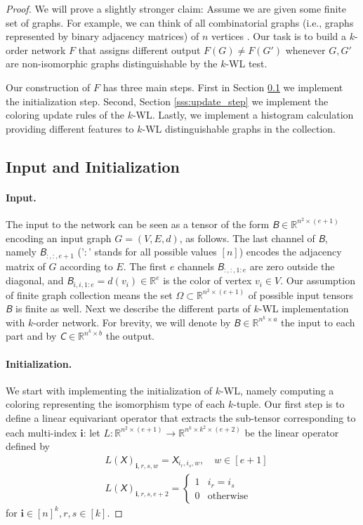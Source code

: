 \documentclass{article}
\newcommand{\Real}{\mathbb R}
\newcommand{\too}{\rightarrow}
\newcommand{\ie}{{i.e.}}
\def\vi{{\bm{i}}}
\newcommand{\tens}[1]{\bm{\mathsfit{#1}}}
\def\tB{{\tens{B}}}
\def\tC{{\tens{C}}}
\def\tX{{\tens{X}}}
\begin{document}
\begin{proof}

We will prove a slightly stronger claim: Assume we are given some finite set of graphs. For example, we can think of all combinatorial graphs (\ie, graphs represented by binary adjacency matrices) of $n$ vertices . Our task is to build a $k$-order network $F$ that assigns different output $F(G)\ne F(G')$ whenever $G,G'$ are non-isomorphic graphs distinguishable by the $k$-WL test. 

Our construction of $F$ has three main steps. First in Section \ref{sss:input_and_init} we implement the initialization step. Second, Section \ref{sss:update_step} we implement the coloring update rules of the $k$-WL. Lastly, we implement a histogram calculation providing different features to $k$-WL distinguishable graphs in the collection. 



\subsection{Input and Initialization}\label{sss:input_and_init}

\paragraph{Input.}
The input to the network can be seen as a tensor of the form  $\tB \in \Real^{n^2\times (e+1)}$ encoding an input graph $G=(V,E,d)$, as follows. 
The last channel of $\tB$, namely $\tB_{:,:,e+1}$ ('$:$' stands for all possible values $[n]$) encodes the adjacency matrix of $G$ according to $E$. The first $e$ channels $\tB_{:,:,1:e}$ are zero outside the diagonal, and $\tB_{i,i,1:e}=d(v_i)\in\Real^e$ is the color of vertex $v_i\in V$. 
Our assumption of finite graph collection means the set $\Omega\subset \Real^{n^2\times (e+1)}$ of possible input tensors $\tB$ is finite as well. 
Next we describe the different parts of $k$-WL implementation with $k$-order network. For brevity, we will denote by $\tB\in\Real^{n^k\times a}$ the input to each part and by $\tC \in \Real^{n^k\times b}$ the output. 

\paragraph{Initialization.}
We start with implementing the initialization of $k$-WL, namely computing a coloring representing the isomorphism type of each $k$-tuple. 
Our first step is to define a linear equivariant operator that extracts the sub-tensor corresponding to each multi-index $\vi$: let $L:\Real^{n^2 \times (e+1)}\too \Real^{n^k \times k^2 \times (e+2)}$ be the linear operator defined by 
\begin{align*}
    &L(\tX)_{\vi,r,s,w} =\tX_{i_{r},i_{s},w}, \quad w\in [e+1] \\ 
    &L(\tX)_{\vi,r,s,e+2} = \begin{cases} 1 & i_r=i_s \\ 0 & \text{otherwise} \end{cases}
\end{align*} 
for $\vi\in [n]^k, r,s\in[k]$. 


\end{proof}
\end{document}
